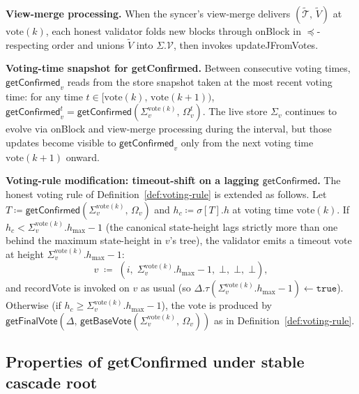 \documentclass{article}
\newcommand{\T}[0]{\ensuremath{\mathcal{T}}}
\newcommand{\hmax}{\ensuremath{h_{\max}}\xspace}
\newcommand{\updateJFromVotes}{\textsf{updateJFromVotes}\xspace}
\newcommand{\vote}{\ensuremath{\mathrm{vote}}}
\newcommand{\comm}[1]{\ensuremath{\widetilde{#1}}}
\newcommand{\getBaseVote}{\textsf{getBaseVote}\xspace}
\newcommand{\getFinalVote}{\textsf{getFinalVote}\xspace}
\newcommand{\recordVote}{\textsf{recordVote}\xspace}
\newcommand{\onBlock}{\textsf{onBlock}\xspace}
\newcommand{\getConfirmed}{\textsf{getConfirmed}\xspace}
\renewcommand{\paragraph}[1]{\vspace{7pt}\noindent\textbf{#1}}
\theoremstyle{plain}
\theoremstyle{definition}
\theoremstyle{remark}
\begin{document}
\paragraph{View-merge processing.}
When the syncer's view-merge delivers $(\comm{\T},\, \comm{V})$ at~$\vote(k)$, each honest validator folds new blocks through \onBlock{} in $\preceq$-respecting order and unions $\comm{V}$ into $\Sigma.\mathcal{V}$, then invokes \updateJFromVotes{}.

\paragraph{Voting-time snapshot for \getConfirmed{}.}
Between consecutive voting times, $\getConfirmed_v$ reads from the store snapshot taken at the most recent voting time: for any time $t \in [\vote(k),\, \vote(k{+}1))$, $\getConfirmed_v^t = \getConfirmed(\Sigma_v^{\vote(k)},\, \Omega_v^t)$.
The live store $\Sigma_v$ continues to evolve via \onBlock{} and view-merge processing during the interval, but those updates become visible to $\getConfirmed_v$ only from the next voting time $\vote(k{+}1)$ onward.

\paragraph{Voting-rule modification: timeout-shift on a lagging $\getConfirmed$.}
The honest voting rule of Definition~\ref{def:voting-rule} is extended as follows.
Let $T \coloneqq \getConfirmed(\Sigma_v^{\vote(k)},\, \Omega_v)$ and $h_c \coloneqq \sigma[T].h$ at voting time $\vote(k)$.
If $h_c < \Sigma_v^{\vote(k)}.\hmax - 1$ (the canonical state-height lags strictly more than one behind the maximum state-height in $v$'s tree), the validator emits a timeout vote at height $\Sigma_v^{\vote(k)}.\hmax - 1$:
\[
  v \;\coloneqq\; (i,\; \Sigma_v^{\vote(k)}.\hmax - 1,\; \bot,\; \bot,\; \bot),
\]
and \recordVote{} is invoked on $v$ as usual (so $\Delta.\tau(\Sigma_v^{\vote(k)}.\hmax - 1) \gets \mathtt{true}$).
Otherwise (if $h_c \geq \Sigma_v^{\vote(k)}.\hmax - 1$), the vote is produced by $\getFinalVote(\Delta,\, \getBaseVote(\Sigma_v^{\vote(k)},\, \Omega_v))$ as in Definition~\ref{def:voting-rule}.

\subsection{Properties of \getConfirmed{} under stable cascade root}\label{sec:getConfirmed-properties}
\end{document}
